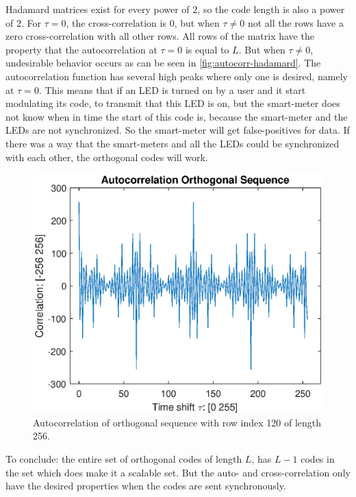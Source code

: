 Hadamard matrices exist for every power of $2$, so the code length is also a power of $2$.
For $\tau = 0$, the cross-correlation is $0$, but when $\tau \neq 0$ not all the rows have a zero cross-correlation with all other rows.
All rows of the matrix have the property that the autocorrelation at $\tau = 0$ is equal to $L$.
But when $\tau \neq 0$, undesirable behavior occurs as can be seen in \autoref{fig:autocorr-hadamard}.
The autocorrelation function has several high peaks where only one is desired, namely at $\tau = 0$.
This means that if an LED is turned on by a user and it start modulating its code, to transmit that this LED is on, but the smart-meter does not know when in time the start of this code is, because the smart-meter and the LEDs are not synchronized.
So the smart-meter will get false-positives for data.
If there was a way that the smart-meters and all the LEDs could be synchronized with each other, the orthogonal codes will work.

\begin{figure}[t]
	\centering
	\includegraphics[width=\textwidth]{chapters/cdma-chapters/codes/autocorr-hadamard.eps}
	\caption{Autocorrelation of orthogonal sequence with row index 120 of length 256.}
	\label{fig:autocorr-hadamard}
\end{figure}





To conclude: the entire set of orthogonal codes of length $L$, has $L - 1$ codes in the set which does make it a scalable set.
But the auto- and cross-correlation only have the desired properties when the codes are sent synchronously. 




